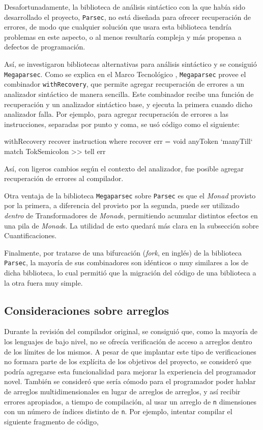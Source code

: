 Desafortunadamente, la biblioteca de análisis sintáctico con la que había sido
desarrollado el proyecto, \texttt{Parsec}, no está diseñada para ofrecer
recuperación de errores, de modo que cualquier solución que usara esta
biblioteca tendría problemas en este aspecto, o al menos resultaría compleja y
más propensa a defectos de programación.

Así, se investigaron bibliotecas alternativas para análisis sintáctico y se
consiguió \texttt{Megaparsec}. Como se explica en el Marco Tecnológico
, \texttt{Megaparsec} provee el
combinador \texttt{withRecovery}, que permite agregar recuperación de errores a
un analizador sintáctico de manera sencilla. Este combinador recibe una función
de recuperación y un analizador sintáctico base, y ejecuta la primera cuando
dicho analizador falla. Por ejemplo, para agregar recuperación de errores a las
instrucciones, separadas por punto y coma, se usó código como el siguiente:

\begin{haskellcode}
  withRecovery recover instruction
    where
      recover err = void anyToken `manyTill` match TokSemicolon >> tell err
\end{haskellcode}

Así, con ligeros cambios según el contexto del analizador, fue posible agregar
recuperación de errores al compilador.

Otra ventaja de la biblioteca \texttt{Megaparsec} sobre \texttt{Parsec} es que
el \emph{Monad} provisto por la primera, a diferencia del provisto por la
segunda, puede ser utilizado \emph{dentro} de Transformadores de \emph{Monad}s,
permitiendo acumular distintos efectos en una pila de \emph{Monad}s. La utilidad
de esto quedará más clara en la subsección sobre Cuantificaciones.

Finalmente, por tratarse de una bifurcación (\emph{fork}, en inglés) de la
biblioteca \texttt{Parsec}, la mayoría de sus combinadores son idénticos o muy
similares a los de dicha biblioteca, lo cual permitió que la migración del
código de una biblioteca a la otra fuera muy simple.

\subsection{Consideraciones sobre arreglos}

Durante la revisión del compilador original, se consiguió que, como la mayoría
de los lenguajes de bajo nivel, no se ofrecía verificación de acceso a arreglos
dentro de los límites de los mismos. A pesar de que implantar este tipo de
verificaciones no formara parte de los explícita de los objetivos del proyecto,
se consideró que podría agregarse esta funcionalidad para mejorar la experiencia
del programador novel. También se consideró que sería cómodo para el programador
poder hablar de arreglos multidimensionales en lugar de arreglos de arreglos, y
así recibir errores apropiados, a tiempo de compilación, al usar un arreglo de
\texttt{n} dimensiones con un número de índices distinto de \texttt{n}. Por
ejemplo, intentar compilar el siguiente fragmento de código,

